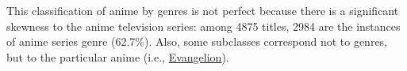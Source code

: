 This classification of anime by genres is not perfect because there is a significant skewness to the anime television series: among \num{4875} titles, {2984} are the instances of anime series genre (\num{62,7}\%). Also, some subclasses correspond not to genres, but to the particular anime (i.e., \href{https://w.wiki/3iKe}{Evangelion}).
